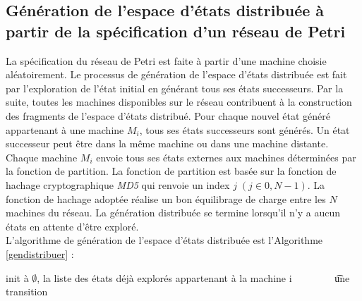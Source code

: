  

\subsection{Génération de l’espace d’états distribuée à partir de la spécification d'un réseau de Petri}{
La spécification du réseau de Petri est faite à partir d'une machine choisie aléatoirement. Le processus de génération de l'espace d'états distribuée est fait par l’exploration de l’état initial en générant tous ses états successeurs. Par la suite, toutes les machines disponibles sur le réseau contribuent à la construction des fragments de l’espace d’états distribué. Pour chaque nouvel état généré appartenant à une machine $M_i$, tous ses états successeurs sont générés. Un état successeur peut être dans la même machine ou dans une machine distante. Chaque machine $M_i$ envoie tous ses états externes aux machines déterminées par la fonction de partition. La fonction de partition est basée sur la fonction de hachage cryptographique \emph{MD5} qui renvoie un index $j\;(j \in 0, N-1)$. La fonction de hachage adoptée réalise un bon équilibrage de charge entre les $N$ machines du réseau.  La génération distribuée se termine lorsqu'il n'y a aucun états en attente d'être exploré.\\
L’algorithme de génération de l’espace d’états distribuée est l'Algorithme \ref{gendistribuer} :\\
\begin{algorithm}
	\SetAlgoLined
	\SetAlgoLined	
	\AlgoDontDisplayBlockMarkers\SetAlgoNoEnd\SetAlgoNoLine%
	\si{init à $\emptyset$, la liste des états déjà explorés appartenant à la machine i }
	\t{une transition}


\end{algorithm}}

